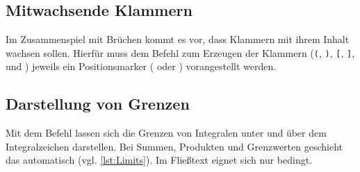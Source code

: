 \begin{table}[H]
\end{table}

\subsection{Mitwachsende Klammern}

Im Zusammenspiel mit Brüchen kommt es vor, dass Klammern mit ihrem Inhalt wachsen sollen.
Hierfür muss dem Befehl zum Erzeugen der Klammern (\texttt{(}, \texttt{)}, \texttt{[}, \texttt{]}, \texttt{\lbrace} und \texttt{\rbrace}) jeweils ein Positionsmarker (\texttt{\left} oder \texttt{\right}) vorangestellt werden.


\subsection{Darstellung von Grenzen}

Mit dem Befehl \texttt{\limits} lassen sich die Grenzen von Integralen unter und über dem Integralzeichen darstellen.
Bei Summen, Produkten und Grenzwerten geschieht das automatisch (vgl. \cref{lst:Limits}).
Im Fließtext eignet sich \texttt{\limits} nur bedingt.

